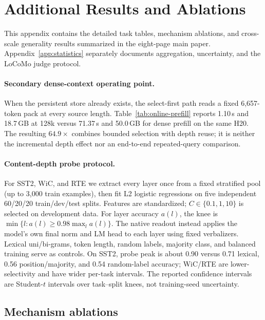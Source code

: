 \section{Additional Results and Ablations}
\label{sec:appendix}

This appendix contains the detailed task tables, mechanism ablations, and
cross-scale generality results summarized in the eight-page main paper.
Appendix~\ref{app:statistics} separately documents aggregation, uncertainty,
and the LoCoMo judge protocol.

\paragraph{Secondary dense-context operating point.}
When the persistent store already exists, the select-first path reads a fixed
6,657-token pack at every source length. Table~\ref{tab:online-prefill} reports
1.10\,s and 18.7\,GB at 128k versus 71.37\,s and 50.0\,GB for dense prefill on
the same H20. The resulting $64.9\times$ combines bounded selection with depth
reuse; it is neither the incremental depth effect nor an end-to-end
repeated-query comparison.



\paragraph{Content-depth probe protocol.}
For SST2, WiC, and RTE we extract every layer once from a fixed stratified pool
(up to 3,000 train examples), then fit L2 logistic regressions on five independent
60/20/20 train/dev/test splits. Features are standardized; $C\in\{0.1,1,10\}$
is selected on development data. For layer accuracy $a(l)$, the knee is
$\min\{l:a(l)\geq0.98\max_l a(l)\}$. The native readout instead applies the
model's own final norm and LM head to each layer using fixed verbalizers. Lexical
uni/bi-grams, token length, random labels, majority class, and balanced training
serve as controls. On SST2, probe peak is about 0.90 versus 0.71 lexical, 0.56
position/majority, and 0.54 random-label accuracy; WiC/RTE are lower-selectivity
and have wider per-task intervals. The reported confidence intervals are
Student-$t$ intervals over task--split knees, not training-seed uncertainty.

\subsection{Mechanism ablations}
\label{app:ablations}

